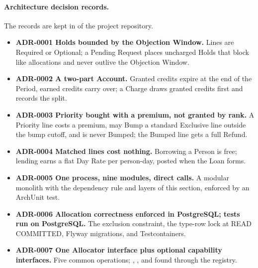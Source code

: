 \paragraph{Architecture decision records.} The records are kept in  of the project repository.
\begin{itemize}
  \item {}\label{adr:0001}\textbf{ADR-0001 Holds bounded by the Objection Window.} Lines are Required or Optional; a Pending Request places uncharged Holds that block like allocations and never outlive the Objection Window.
  \item {}\label{adr:0002}\textbf{ADR-0002 A two-part Account.} Granted credits expire at the end of the Period, earned credits carry over; a Charge draws granted credits first and records the split.
  \item {}\label{adr:0003}\textbf{ADR-0003 Priority bought with a premium, not granted by rank.} A Priority line costs a premium, may Bump a standard Exclusive line outside the bump cutoff, and is never Bumped; the Bumped line gets a full Refund.
  \item {}\label{adr:0004}\textbf{ADR-0004 Matched lines cost nothing.} Borrowing a Person is free; lending earns a flat Day Rate per person-day, posted when the Loan forms.
  \item {}\label{adr:0005}\textbf{ADR-0005 One process, nine modules, direct calls.} A modular monolith with the dependency rule and layers of this section, enforced by an ArchUnit test.
  \item {}\label{adr:0006}\textbf{ADR-0006 Allocation correctness enforced in PostgreSQL; tests run on PostgreSQL.} The exclusion constraint, the type-row lock at READ COMMITTED, Flyway migrations, and Testcontainers.
  \item {}\label{adr:0007}\textbf{ADR-0007 One Allocator interface plus optional capability interfaces.} Five common operations; , , and  found through the registry.
\end{itemize}

